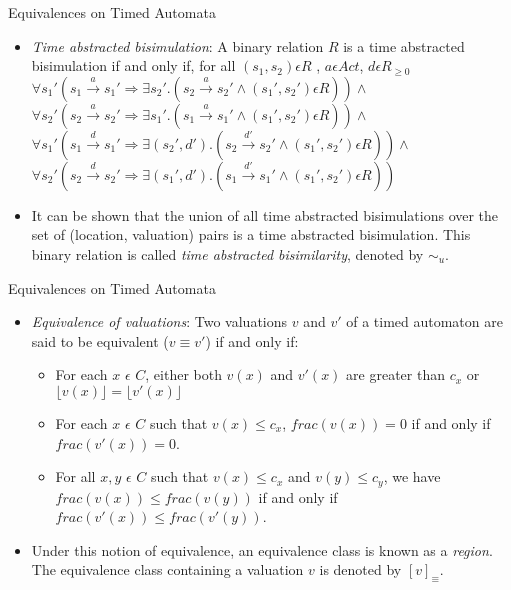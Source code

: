 \documentclass{beamer}
\begin{document}
\begin{frame}{Equivalences on Timed Automata}

  \begin{itemize}
  \item \emph{Time abstracted bisimulation}: A binary relation $R$ is
    a time abstracted
    bisimulation if and only if, for all $(s_1, s_2) \epsilon R$ , $a \epsilon Act $, $d \epsilon R_{\ge 0}$\\
    $\forall s_1' (s_1 \xrightarrow{a} s_1' \Rightarrow \exists s_2'
    . (s_2 \xrightarrow{a} s_2' \wedge (s_1', s_2') \epsilon R ) )
    \wedge $ \\
    $\forall s_2' (s_2 \xrightarrow{a} s_2' \Rightarrow \exists s_1'
    . (s_1 \xrightarrow{a} s_1' \wedge (s_1', s_2') \epsilon R ) ) \wedge $ \\
    $\forall s_1' (s_1 \xrightarrow{d} s_1' \Rightarrow \exists (s_2',
    d')
    . (s_2 \xrightarrow{d'} s_2' \wedge (s_1', s_2') \epsilon R ) )
    \wedge $ \\
    $\forall s_2' (s_2 \xrightarrow{d} s_2' \Rightarrow \exists (s_1', d')
    . (s_1 \xrightarrow{d'} s_1' \wedge (s_1', s_2') \epsilon R ) ) $ \\

  \item It can be shown that the union of all time abstracted bisimulations
    over the set of (location, valuation) pairs is a time abstracted
    bisimulation. This binary
    relation is called \textit{time abstracted bisimilarity}, denoted
    by $\sim_u$.
  \end{itemize}

\end{frame}

\begin{frame}{Equivalences on Timed Automata}

  \begin{itemize}

  \item \emph{Equivalence of valuations}: Two valuations $v$ and $v'$ of
    a timed automaton are said to be equivalent ($v \equiv v'$) if and
    only if:
    \begin{itemize}
    \item For each $x$ $\epsilon$ $C$, either both $v(x)$ and $v'(x)$ are
      greater than $c_x$ or $\lfloor v(x) \rfloor = \lfloor v'(x)
      \rfloor$
    \item For each $x$ $\epsilon$ $C$ such that $v(x) \le c_x$,
      $frac(v(x))=0$ if and only if $frac(v'(x))=0$.
    \item For all $x,y$ $\epsilon$ $C$ such that $v(x) \le c_x$ and $v(y)
      \le c_y$, we have $frac(v(x)) \le frac(v(y))$ if and only if
      $frac(v'(x)) \le frac(v'(y))$.
    \end{itemize}

  \item Under this notion of equivalence, an equivalence class is known
    as a \emph{region}. The equivalence class containing a valuation $v$
    is denoted by $[v]_{\equiv}$.

  \end{itemize}

\end{frame}
\end{document}
